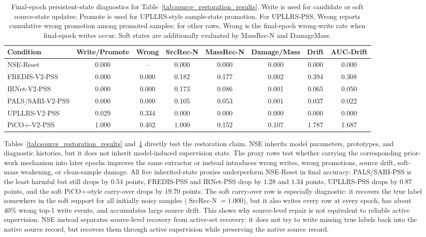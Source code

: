 \begin{table}[t]
\centering
\tiny
\setlength{\tabcolsep}{2pt}
\begin{tabular}{l|c|c|c|c|c|c|c}
\toprule
\textbf{Condition} & \textbf{Write/Promote} & \textbf{Wrong} & \textbf{SrcRec-N} & \textbf{MassRec-N} & \textbf{Damage/Mass} & \textbf{Drift} & \textbf{AUC-Drift} \\
\midrule
\rowcolor{gray!15} NSE-Reset & 0.000 & -- & 0.000 & 0.000 & 0.000 & 0.000 & 0.000 \\
FREDIS-V2-PSS & 0.000 & 0.000 & 0.182 & 0.177 & 0.002 & 0.394 & 0.308 \\
IRNet-V2-PSS & 0.000 & 0.000 & 0.173 & 0.086 & 0.001 & 0.065 & 0.050 \\
PALS/SARI-V2-PSS & 0.000 & 0.000 & 0.105 & 0.053 & 0.001 & 0.037 & 0.022 \\
UPLLRS-V2-PSS & 0.029 & 0.334 & 0.000 & 0.000 & 0.000 & 0.000 & 0.000 \\
PiCO+-V2-PSS & 1.000 & 0.402 & 1.000 & 0.152 & 0.107 & 1.787 & 1.687 \\
\bottomrule
\end{tabular}
\caption{Final-epoch persistent-state diagnostics for Table~\ref{tab:source_restoration_results}. Write is used for candidate or soft source-state updates; Promote is used for UPLLRS-style sample-state promotion. For UPLLRS-PSS, Wrong reports cumulative wrong promotion among promoted samples; for other rows, Wrong is the final-epoch wrong-write rate when final-epoch writes occur. Soft states are additionally evaluated by MassRec-N and DamageMass.}
\label{tab:source_contamination}
\end{table}

Tables~\ref{tab:source_restoration_results} and~\ref{tab:source_contamination}
directly test the restoration claim. NSE inherits model parameters, prototypes,
and diagnostic histories, but it does not inherit model-induced supervision
state. The proxy rows test whether carrying the corresponding prior-work
mechanism into later epochs improves the same extractor or instead introduces
wrong writes, wrong promotions, source drift, soft-mass weakening, or
clean-sample damage. All five inherited-state proxies underperform NSE-Reset in
final accuracy: PALS/SARI-PSS is the least harmful but still drops by
$0.54$ points, FREDIS-PSS and IRNet-PSS drop by $1.28$ and $1.34$ points,
UPLLRS-PSS drops by $0.87$ points, and the soft PiCO+-style carry-over drops by
$19.70$ points. The soft carry-over row is especially diagnostic: it recovers
the true label somewhere in the soft support for all initially noisy samples
($\operatorname{SrcRec\mbox{-}N}=1.000$), but it also writes every row at every
epoch, has about $40\%$ wrong top-1 write events, and accumulates large source
drift. This shows why source-level repair is not equivalent to reliable active
supervision. NSE instead separates source-level recovery from active-set
recovery: it does not try to write missing true labels back into the native
source record, but recovers them through active supervision while preserving the
native source record.
